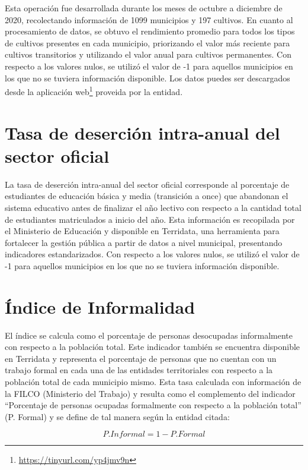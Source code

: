 Esta operación fue desarrollada durante los meses de octubre a diciembre de 2020, recolectando información de 1099 municipios y 197 cultivos. En cuanto al 
procesamiento de datos, se obtuvo el rendimiento promedio para todos los tipos de cultivos presentes en cada municipio, priorizando el valor más reciente para 
cultivos transitorios y utilizando el valor anual para cultivos permanentes. Con respecto a los valores nulos, se utilizó el valor de -1 para aquellos 
municipios en los que no se tuviera información disponible.  Los datos puedes ser descargados desde la aplicación 
web\footnote{\url{https://tinyurl.com/yp4jmv9n}} proveida por la entidad.
 
\section{Tasa de deserción intra-anual del sector oficial}

La tasa de deserción intra-anual del sector oficial corresponde al porcentaje de estudiantes de educación básica y media (transición a once) que abandonan el 
sistema educativo antes de finalizar el año lectivo con respecto a la cantidad total de estudiantes matriculados a inicio del año. Esta información es 
recopilada por el Ministerio de Educación y disponible en Terridata, una herramienta para fortalecer la gestión pública a partir de datos a nivel municipal, 
presentando indicadores estandarizados. Con respecto a los valores nulos, se utilizó el valor de -1 para aquellos municipios en los que no se tuviera 
información disponible.

\section{Índice de Informalidad}

El índice se calcula como el porcentaje de personas desocupadas informalmente con respecto a la población total.  Este indicador también se encuentra 
disponible en Terridata y representa el porcentaje de personas que no cuentan con un trabajo formal en cada una de las entidades territoriales con respecto a 
la población total de cada municipio mismo. Esta tasa calculada con información de la FILCO (Ministerio del Trabajo) y resulta como el complemento del 
indicador ``Porcentaje de personas ocupadas formalmente con respecto a la población total'' (P. Formal) y se define de tal manera según la entidad citada: 

$$P. Informal = 1 - P. Formal$$


